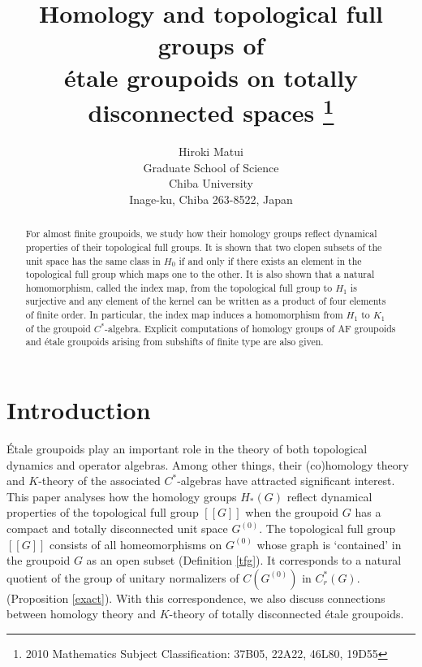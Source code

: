\documentclass[11pt]{article}
\title{Homology and topological full groups of \\
\'etale groupoids on totally disconnected spaces
\thanks{2010 Mathematics Subject Classification: 
37B05, 22A22, 46L80, 19D55}}
\author{Hiroki Matui \\
Graduate School of Science \\
Chiba University \\
Inage-ku, Chiba 263-8522, Japan}
\date{}
\theoremstyle{definition}
\begin{document}
\maketitle

\begin{abstract}
For almost finite groupoids, 
we study how their homology groups reflect 
dynamical properties of their topological full groups. 
It is shown that 
two clopen subsets of the unit space has the same class in $H_0$ 
if and only if there exists an element in the topological full group 
which maps one to the other. 
It is also shown that a natural homomorphism, called the index map, 
from the topological full group to $H_1$ is surjective and 
any element of the kernel can be written 
as a product of four elements of finite order. 
In particular, the index map induces a homomorphism 
from $H_1$ to $K_1$ of the groupoid $C^*$-algebra. 
Explicit computations of homology groups of AF groupoids 
and \'etale groupoids arising from subshifts of finite type are also given. 
\end{abstract}




\section{Introduction}

\'Etale groupoids play an important role 
in the theory of both topological dynamics and operator algebras. 
Among other things, 
their (co)homology theory and $K$-theory of the associated $C^*$-algebras 
have attracted significant interest. 
This paper analyses 
how the homology groups $H_*(G)$ reflect 
dynamical properties of the topological full group $[[G]]$ 
when the groupoid $G$ has 
a compact and totally disconnected unit space $G^{(0)}$. 
The topological full group $[[G]]$ consists of 
all homeomorphisms on $G^{(0)}$ 
whose graph is `contained' in the groupoid $G$ as an open subset 
(Definition \ref{tfg}). 
It corresponds to a natural quotient 
of the group of unitary normalizers of $C(G^{(0)})$ in $C^*_r(G)$. 
(Proposition \ref{exact}). 
With this correspondence, 
we also discuss connections between homology theory and $K$-theory of 
totally disconnected \'etale groupoids. 
\end{document}
